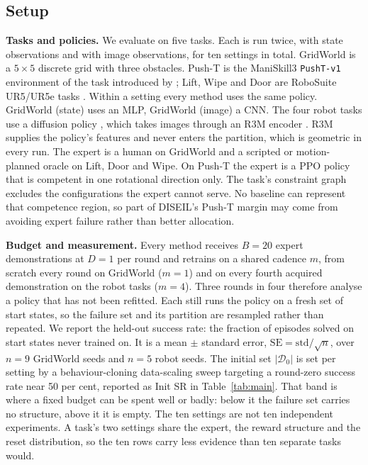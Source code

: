 \subsection{Setup}

\noindent\textbf{Tasks and policies.}
We evaluate on five tasks. Each is run twice, with state observations and with
image observations, for ten settings in total. GridWorld is a $5 \times 5$
discrete grid with three obstacles. Push-T is the ManiSkill3 \texttt{PushT-v1}
environment \cite{tao2024maniskill3} of the task introduced by
\citet{florence2021implicitbc}; Lift, Wipe and Door are RoboSuite UR5/UR5e tasks
\cite{zhu2020robosuite}. Within a setting every method uses the same policy.
GridWorld (state) uses an MLP, GridWorld (image) a CNN. The four robot tasks use a
diffusion policy \cite{chi2023diffusionpolicy}, which takes images through an R3M
encoder \cite{nair2022r3m}. R3M supplies the policy's
features and never enters the partition, which is geometric in every run. The
expert is a human on GridWorld and a scripted or motion-planned oracle on Lift,
Door and Wipe. On Push-T the expert is a PPO policy \cite{schulman2017ppo} that
is competent in one rotational direction only. The task's constraint graph
excludes the configurations the expert cannot serve. No baseline can represent
that competence region, so part of DISEIL's Push-T margin may come from avoiding
expert failure rather than better allocation.

\noindent\textbf{Budget and measurement.}
Every method receives $B = 20$ expert demonstrations at $D = 1$ per round and
retrains on a shared cadence $m$, from scratch every round on GridWorld
($m = 1$) and on every fourth acquired demonstration on the robot tasks
($m = 4$). Three rounds in four therefore analyse a policy that has not been
refitted. Each still runs the policy on a fresh set of start states, so the
failure set and its partition are resampled rather than repeated. We report the
held-out success rate: the fraction of episodes solved on start states never
trained on. It is a mean $\pm$ standard error, $\mathrm{SE} =
\mathrm{std}/\sqrt{n}$, over $n = 9$ GridWorld seeds and $n = 5$ robot seeds. The
initial set
$|\mathcal{D}_0|$ is set per setting by a behaviour-cloning data-scaling sweep
targeting a round-zero success rate near 50 per cent, reported as Init SR in
Table~\ref{tab:main}. That band is where a fixed budget can be spent well or
badly: below it the failure set carries no structure, above it it is empty. The
ten settings are not ten independent experiments. A task's two settings share the
expert, the reward structure and the reset distribution, so the ten rows carry
less evidence than ten separate tasks would.

